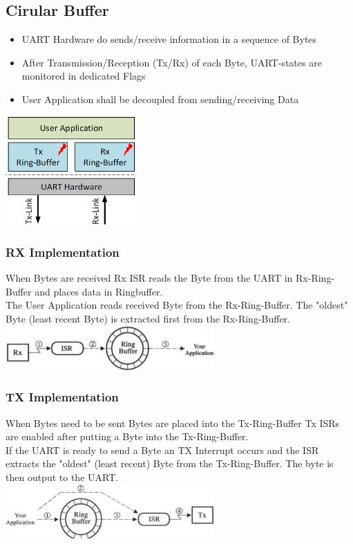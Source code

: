 \subsection{Cirular Buffer}
\begin{minipage}{12cm}
	\begin{itemize}
		\item UART Hardware do sends/receive information in a sequence of Bytes
		\item After Transmission/Reception (Tx/Rx) of each Byte, UART-states are monitored in dedicated Flags
		\item User Application shall be decoupled from sending/receiving Data
	\end{itemize}
\end{minipage}
\begin{minipage}{5cm}
	\includegraphics[width=5cm]{images/ringbuffer.png}
\end{minipage}
\begin{multicols}{2}
\subsubsection{RX Implementation}
When Bytes are received Rx ISR reads the Byte from the UART in Rx-Ring-Buffer and places data in Ringbuffer. \\
The User Application reads received Byte from the Rx-Ring-Buffer. The "oldest" Byte (least recent Byte) is extracted first from the Rx-Ring-Buffer.\\
\includegraphics[width=8cm]{images/rx_buffer.png}
\subsubsection{TX Implementation}
When Bytes need to be sent Bytes are placed into the Tx-Ring-Buffer Tx ISRs are enabled after putting a Byte into the Tx-Ring-Buffer. \\
If the UART is ready to send a Byte an TX Interrupt occurs and the ISR extracts the "oldest" (least recent) Byte from the Tx-Ring-Buffer. The byte is then output to the UART.\\
\includegraphics[width=8cm]{images/tx_buffer.png}
\end{multicols}

